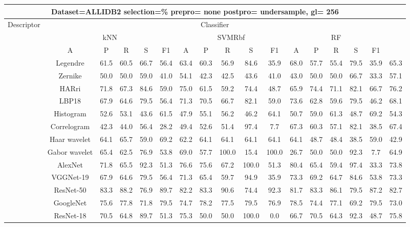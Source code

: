 \documentclass[12pt,italian]{article}
\begin{document}
\begin{tiny}
\begin{longtable}{lcccccccccccccccc}
\toprule
\multicolumn{16}{c}{Dataset=ALLIDB2 selection=\% prepro= none postpro= undersample, gl= 256} \\ 
\toprule
Descriptor & \multicolumn{15}{c}{Classifier} \\ 
& \multicolumn{5}{c}{kNN} & \multicolumn{5}{c}{SVMRbf} & \multicolumn{5}{c}{RF} \\ 
& A & P & R & S & F1 & A & P & R & S & F1 & A & P & R & S & F1 \\ 
\midrule
& Legendre & 61.5 & 60.5 & 66.7 & 56.4 & 63.4 & 60.3 & 56.9 & 84.6 & 35.9 & 68.0 & 57.7 & 55.4 & 79.5 & 35.9 & 65.3 \\ 
& Zernike & 50.0 & 50.0 & 59.0 & 41.0 & 54.1 & 42.3 & 42.5 & 43.6 & 41.0 & 43.0 & 50.0 & 50.0 & 66.7 & 33.3 & 57.1 \\ 
& HARri & 71.8 & 67.3 & 84.6 & 59.0 & 75.0 & 61.5 & 59.2 & 74.4 & 48.7 & 65.9 & 74.4 & 71.1 & 82.1 & 66.7 & 76.2 \\ 
& LBP18 & 67.9 & 64.6 & 79.5 & 56.4 & 71.3 & 70.5 & 66.7 & 82.1 & 59.0 & 73.6 & 62.8 & 59.6 & 79.5 & 46.2 & 68.1 \\ 
& Histogram & 52.6 & 53.1 & 43.6 & 61.5 & 47.9 & 55.1 & 56.2 & 46.2 & 64.1 & 50.7 & 59.0 & 61.3 & 48.7 & 69.2 & 54.3 \\ 
& Correlogram & 42.3 & 44.0 & 56.4 & 28.2 & 49.4 & 52.6 & 51.4 & 97.4 &  7.7 & 67.3 & 60.3 & 57.1 & 82.1 & 38.5 & 67.4 \\ 
& Haar wavelet & 64.1 & 65.7 & 59.0 & 69.2 & 62.2 & 64.1 & 64.1 & 64.1 & 64.1 & 64.1 & 48.7 & 48.4 & 38.5 & 59.0 & 42.9 \\ 
& Gabor wavelet & 65.4 & 62.5 & 76.9 & 53.8 & 69.0 & 57.7 & 100.0 & 15.4 & 100.0 & 26.7 & 50.0 & 50.0 & 92.3 &  7.7 & 64.9 \\ 
& AlexNet & 71.8 & 65.5 & 92.3 & 51.3 & 76.6 & 75.6 & 67.2 & 100.0 & 51.3 & 80.4 & 65.4 & 59.4 & 97.4 & 33.3 & 73.8 \\ 
& VGGNet-19 & 67.9 & 64.6 & 79.5 & 56.4 & 71.3 & 65.4 & 59.7 & 94.9 & 35.9 & 73.3 & 69.2 & 64.7 & 84.6 & 53.8 & 73.3 \\ 
& ResNet-50 & 83.3 & 88.2 & 76.9 & 89.7 & 82.2 & 83.3 & 90.6 & 74.4 & 92.3 & 81.7 & 83.3 & 86.1 & 79.5 & 87.2 & 82.7 \\ 
& GoogleNet & 75.6 & 77.8 & 71.8 & 79.5 & 74.7 & 78.2 & 77.5 & 79.5 & 76.9 & 78.5 & 74.4 & 77.1 & 69.2 & 79.5 & 73.0 \\ 
& ResNet-18 & 70.5 & 64.8 & 89.7 & 51.3 & 75.3 & 50.0 & 50.0 & 100.0 &  0.0 & 66.7 & 70.5 & 64.3 & 92.3 & 48.7 & 75.8 \\ 

\end{longtable}
\end{tiny}
\end{document}
